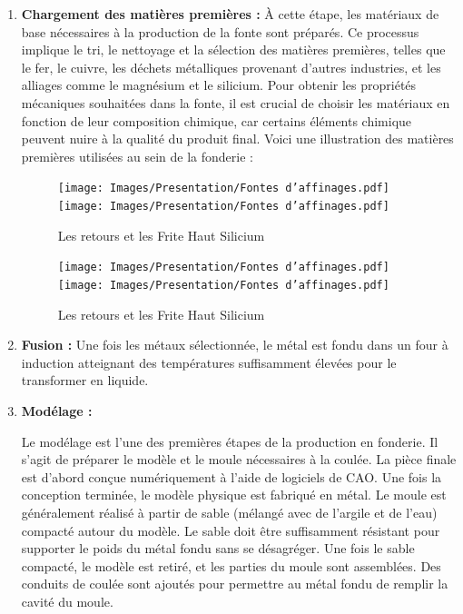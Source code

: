 \documentclass[12pt]{article}
\begin{document}
\begin{enumerate}
    \item \textbf{Chargement des matières premières :}
    À cette étape, les matériaux de base nécessaires à la production de la fonte sont 
    préparés. Ce processus implique le tri, le nettoyage et la sélection des matières 
    premières, telles que le fer, le cuivre, les déchets métalliques provenant d'autres 
    industries, et les alliages comme le magnésium et le silicium. Pour obtenir les 
    propriétés mécaniques souhaitées dans la fonte, il est crucial de choisir les 
    matériaux en fonction de leur composition chimique, car certains éléments chimique 
    peuvent nuire à la qualité du produit final. 
    Voici une illustration des matières premières utilisées au sein de la fonderie :


    \begin{figure}[H]
        \centering
        \vfill
        \hspace{0.8 cm}
        \texttt{[image: Images/Presentation/Fontes d'affinages.pdf]}
        \hspace{0.5 cm}
        \texttt{[image: Images/Presentation/Fontes d'affinages.pdf]}
        \caption{Les retours et les Frite Haut Silicium}
    \end{figure}

    \begin{figure}[H]
        \centering
        \vfill
        \hspace{0.8 cm}
        \texttt{[image: Images/Presentation/Fontes d'affinages.pdf]}
        \hspace{0.5 cm}
        \texttt{[image: Images/Presentation/Fontes d'affinages.pdf]}
        \caption{Les retours et les Frite Haut Silicium}
    \end{figure}


    \item \textbf{Fusion :} Une fois les métaux sélectionnée, le métal est fondu dans 
    un four à induction atteignant des températures suffisamment élevées pour le 
    transformer en liquide.



    \item \textbf{Modélage :} 

    Le modélage est l'une des premières étapes de la production en fonderie. Il s'agit 
    de préparer le modèle et le moule nécessaires à la coulée. La pièce finale est 
    d'abord conçue numériquement à l'aide de logiciels de CAO. Une fois la conception 
    terminée, le modèle physique est fabriqué en métal. Le moule est généralement réalisé à partir de sable (mélangé avec de l'argile et 
    de l'eau) compacté autour du modèle. Le sable doit être suffisamment résistant pour supporter le 
    poids du métal fondu sans se désagréger. Une fois le sable compacté, le modèle est retiré, et les parties du moule sont 
    assemblées. Des conduits de coulée sont ajoutés pour permettre au métal fondu de 
    remplir la cavité du moule.


\end{enumerate}
\end{document}
